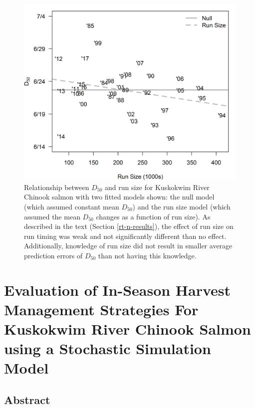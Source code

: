 \documentclass[12pt,]{book}
\theoremstyle{definition}
\theoremstyle{definition}
\theoremstyle{definition}
\theoremstyle{remark}
\begin{document}
\begin{figure}
  \centering
  \includegraphics{img/Ch2/rt-n.png}
  \caption{Relationship between $D_{50}$ and run size for Kuskokwim River Chinook salmon with two fitted models shown: the null model (which assumed constant mean $D_{50}$) and the run size model (which assumed the mean $D_{50}$ changes as a function of run size). As described in the text (Section \ref{rt-n-results}), the effect of run size on run timing was weak and not significantly different than no effect. Additionally, knowledge of run size did not result in smaller average prediction errors of $D_{50}$ than not having this knowledge.}
  \label{fig:rt-n}
\end{figure}

\chapter{Evaluation of In-Season Harvest Management Strategies For
Kuskokwim River Chinook Salmon using a Stochastic Simulation
Model}\label{ch3}

\section*{Abstract}\label{abstract-1}
\end{document}
